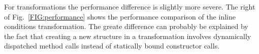 For transformations the performance difference is slightly more severe.
The right of Fig.~\ref{FIG:performance} shows the performance comparison of the inline conditions transformation. 
The greate difference can probably be explained by the fact that creating a new structure in a \name transformation involves dynamically dispatched method calls instead of statically bound constructor calls. 




